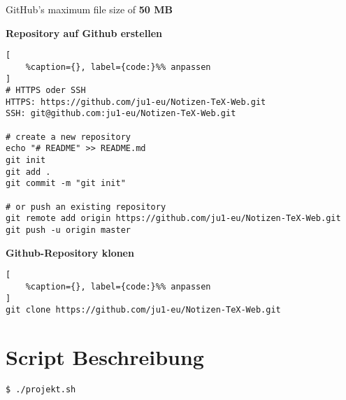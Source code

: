 GitHub's maximum file size of \textbf{50 MB}

\textbf{Repository auf Github erstellen}

\lstset{language=C}%
\begin{lstlisting}[
	%caption={}, label={code:}%% anpassen
]
# HTTPS oder SSH
HTTPS: https://github.com/ju1-eu/Notizen-TeX-Web.git
SSH: git@github.com:ju1-eu/Notizen-TeX-Web.git

# create a new repository 
echo "# README" >> README.md
git init
git add .
git commit -m "git init"
                
# or push an existing repository 
git remote add origin https://github.com/ju1-eu/Notizen-TeX-Web.git
git push -u origin master
\end{lstlisting}

\textbf{Github-Repository klonen}

\lstset{language=C}%
\begin{lstlisting}[
	%caption={}, label={code:}%% anpassen
]
git clone https://github.com/ju1-eu/Notizen-TeX-Web.git
\end{lstlisting}

\section{Script Beschreibung}\label{script-beschreibung}

\verb|$ ./projekt.sh|

